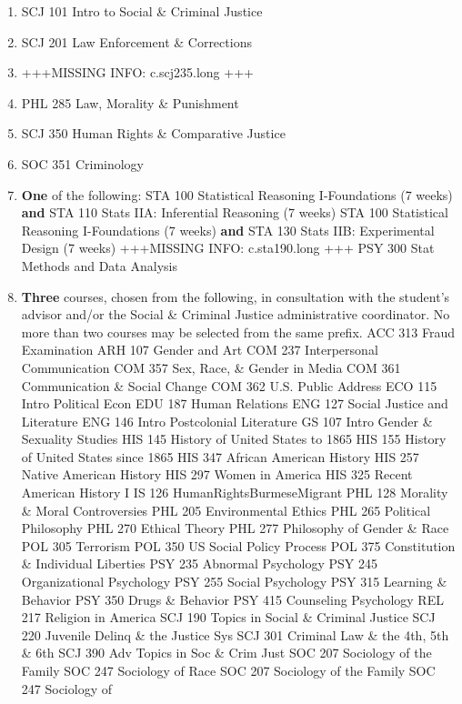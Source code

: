 \documentclass[
  letterpaper,
]{scrbook}
\begin{document}
\begin{enumerate}
\def\labelenumi{\arabic{enumi}.}
\item
  SCJ 101 Intro to Social \& Criminal Justice
\item
  SCJ 201 Law Enforcement \& Corrections
\item
  +++MISSING INFO: c.scj235.long +++
\item
  PHL 285 Law, Morality \& Punishment
\item
  SCJ 350 Human Rights \& Comparative Justice
\item
  SOC 351 Criminology
\item
  \textbf{One} of the following: STA 100 Statistical Reasoning
  I-Foundations (7 weeks) \textbf{and} STA 110 Stats IIA: Inferential
  Reasoning (7 weeks) STA 100 Statistical Reasoning I-Foundations (7
  weeks) \textbf{and} STA 130 Stats IIB: Experimental Design (7 weeks)
  +++MISSING INFO: c.sta190.long +++ PSY 300 Stat Methods and Data
  Analysis
\item
  \textbf{Three} courses, chosen from the following, in consultation
  with the student's advisor and/or the Social \& Criminal Justice
  administrative coordinator. No more than two courses may be selected
  from the same prefix. ACC 313 Fraud Examination ARH 107 Gender and Art
  COM 237 Interpersonal Communication COM 357 Sex, Race, \& Gender in
  Media COM 361 Communication \& Social Change COM 362 U.S. Public
  Address ECO 115 Intro Political Econ EDU 187 Human Relations ENG 127
  Social Justice and Literature ENG 146 Intro Postcolonial Literature GS
  107 Intro Gender \& Sexuality Studies HIS 145 History of United States
  to 1865 HIS 155 History of United States since 1865 HIS 347 African
  American History HIS 257 Native American History HIS 297 Women in
  America HIS 325 Recent American History I IS 126
  HumanRightsBurmeseMigrant PHL 128 Morality \& Moral Controversies PHL
  205 Environmental Ethics PHL 265 Political Philosophy PHL 270 Ethical
  Theory PHL 277 Philosophy of Gender \& Race POL 305 Terrorism POL 350
  US Social Policy Process POL 375 Constitution \& Individual Liberties
  PSY 235 Abnormal Psychology PSY 245 Organizational Psychology PSY 255
  Social Psychology PSY 315 Learning \& Behavior PSY 350 Drugs \&
  Behavior PSY 415 Counseling Psychology REL 217 Religion in America SCJ
  190 Topics in Social \& Criminal Justice SCJ 220 Juvenile Delinq \&
  the Justice Sys SCJ 301 Criminal Law \& the 4th, 5th \& 6th SCJ 390
  Adv Topics in Soc \& Crim Just SOC 207 Sociology of the Family SOC 247
  Sociology of Race SOC 207 Sociology of the Family SOC 247 Sociology of

\end{enumerate}
\end{document}
